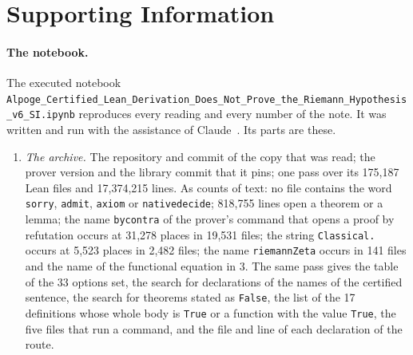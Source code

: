 \documentclass[11pt]{article}
\theoremstyle{definition}
\theoremstyle{remark}
\DeclareRobustCommand{\lean}[1]{{\renewcommand{\_}{\textunderscore\allowbreak}\texttt{#1}}}
\newcommand{\True}{\lean{True}}
\newcommand{\False}{\lean{False}}
\begin{document}
\appendix

\section{Supporting Information}\label{app:si}

\paragraph{The notebook.} The executed notebook \nolinkurl{Alpoge_Certified_Lean_Derivation_Does_Not_Prove_the_Riemann_Hypothesis_v6_SI.ipynb} reproduces every reading and every number of the note. It was written and run with the assistance of Claude~\citep{claude}. Its parts are these.
\begin{enumerate}[leftmargin=2em,itemsep=1pt]
\item \emph{The archive.} The repository and commit of the copy that was read; the prover version and the library commit that it pins; one pass over its 175{,}187 Lean files and 17{,}374{,}215 lines. As counts of text: no file contains the word \lean{sorry}, \lean{admit}, \lean{axiom} or \lean{native\_decide}; 818{,}755 lines open a theorem or a lemma; the name \lean{by\_contra} of the prover's command that opens a proof by refutation occurs at 31{,}278 places in 19{,}531 files; the string \lean{Classical.} occurs at 5{,}523 places in 2{,}482 files; the name \lean{riemannZeta} occurs in 141 files and the name of the functional equation in 3. The same pass gives the table of the 33 options set, the search for declarations of the names of the certified sentence, the search for theorems stated as \False, the list of the 17 definitions whose whole body is \True{} or a function with the value \True, the five files that run a command, and the file and line of each declaration of the route.

\end{enumerate}
\end{document}
